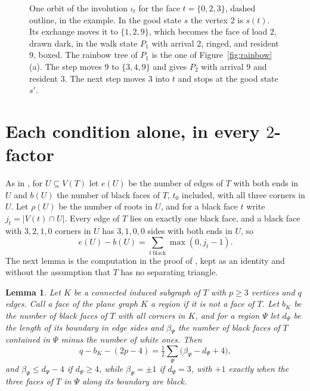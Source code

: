 \documentclass[10pt]{amsart}
\numberwithin{equation}{section}
\newtheorem{lemma}[equation]{Lemma}
\theoremstyle{definition}
\theoremstyle{remark}
\begin{document}
\begin{figure}[H]
\centering
\scalebox{.9}{\begin{minipage}{\textwidth}\centering\end{minipage}}
\caption{One orbit of the involution $\iota_t$ for the face $t=\{0,2,3\}$, dashed outline, in the example. In the good state $s$ the vertex $2$ is $s(t)$. Its exchange moves it to $\{1,2,9\}$, which becomes the face of load $2$, drawn dark, in the walk state $P_1$ with arrival $2$, ringed, and resident $9$, boxed. The rainbow tree of $P_1$ is the one of Figure~\ref{fig:rainbow}(a). The step moves $9$ to $\{3,4,9\}$ and gives $P_2$ with arrival $9$ and resident $3$. The next step moves $3$ into $t$ and stops at the good state $s'$.}
\label{fig:orbit}
\end{figure}

\section{Each condition alone, in every \texorpdfstring{$2$}{2}-factor}\label{sec:packing}

As in \cite[Section~4]{Paper}, for $U\subseteq V(T)$ let $e(U)$ be the number of edges of $T$ with both ends in $U$ and $b(U)$ the number of black faces of $T$, $t_0$ included, with all three corners in $U$.
Let $\rho(U)$ be the number of roots in $U$, and for a black face $t$ write $j_t=|V(t)\cap U|$.
Every edge of $T$ lies on exactly one black face, and a black face with $3,2,1,0$ corners in $U$ has $3,1,0,0$ sides with both ends in $U$, so
\begin{equation}\label{eq:shortfall}
e(U)-b(U)=\sum_{t\ \mathrm{black}}\max(0,j_t-1).
\end{equation}
The next lemma is the computation in the proof of \cite[Lemma~4.4]{Paper}, kept as an identity and without the assumption that $T$ has no separating triangle.

\begin{lemma}\label{lem:identity}
Let $K$ be a connected induced subgraph of $T$ with $p\ge3$ vertices and $q$ edges.
Call a face of the plane graph $K$ a \emph{region} if it is not a face of $T$.
Let $b_K$ be the number of black faces of $T$ with all corners in $K$, and for a region $\Psi$ let $d_\Psi$ be the length of its boundary in edge sides and $\beta_\Psi$ the number of black faces of $T$ contained in $\Psi$ minus the number of white ones.
Then
\[
q-b_K-(2p-4)=\tfrac12\sum_{\Psi}\bigl(\beta_\Psi-d_\Psi+4\bigr),
\]
and $\beta_\Psi\le d_\Psi-4$ if $d_\Psi\ge4$, while $\beta_\Psi=\pm1$ if $d_\Psi=3$, with $+1$ exactly when the three faces of $T$ in $\Psi$ along its boundary are black.
\end{lemma}
\end{document}

